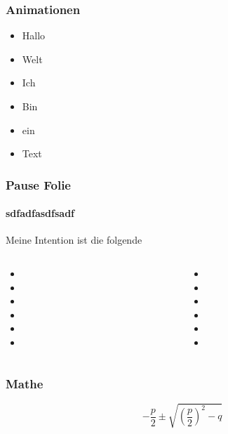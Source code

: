 \documentclass[12pt,ngerman]{beamer}
\begin{document}
\begin{frame}
\frametitle{Animationen}

\begin{itemize}
\item<2> Hallo
\item<-3> Welt
\item<1,3> Ich
\item<1-> Bin
\item ein
\item Text
\end{itemize}
\end{frame}

\begin{frame}
\frametitle{Pause Folie}
\framesubtitle{sdfadfasdfsadf}

Meine Intention ist die folgende

\begin{columns}
\begin{column}{0.49\textwidth}
\pause
\begin{itemize}
	\item 
	\item 
	\item 
	\item 
	\item 
	\item 
	\end{itemize}
\end{column}
\begin{column}{0.49\textwidth}
\pause
\begin{itemize}
	\item 
	\item 
	\item 
	\item 
	\item 
	\item 
	\end{itemize}
\end{column}
\end{columns}

\end{frame}


\begin{frame}
\frametitle{Mathe}

\begin{equation}
-\frac{p}{2} \pm \sqrt{ \left(\frac{p}{2} \right)^2 -q }
\end{equation}


\end{frame}
\end{document}
